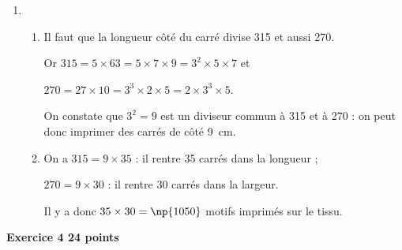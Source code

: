 \documentclass[10pt]{article}
\begin{document}
\begin{enumerate}
\item %

	\begin{enumerate}
		\item %
		
Il faut que la longueur côté du carré divise 315 et aussi 270.

Or $315 = 5 \times 63 = 5 \times 7 \times 9 = 3^2 \times 5 \times 7$ et 

$270 = 27 \times 10 = 3^3 \times 2 \times 5 = 2 \times 3^3 \times 5$.

On constate que $3^2 = 9$ est un diviseur commun à 315 et à 270 : on peut donc imprimer des carrés de côté 9~cm.
		\item %
		
On a $315 = 9 \times 35$ : il rentre 35 carrés dans la longueur ;

$270 = 9 \times 30$ : il rentre 30 carrés dans la largeur.

Il y a donc $35 \times 30 = \np{1050}$ motifs imprimés sur le tissu.
	\end{enumerate}
\end{enumerate}

\bigskip

\textbf{Exercice 4 \hfill 24 points}

\medskip
\end{document}

